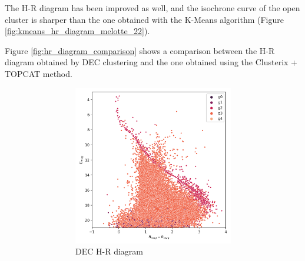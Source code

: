 \documentclass[11pt, a4paper, english]{book}
\begin{document}
The H-R diagram has been improved as well, and the isochrone curve of the open cluster is sharper than the one obtained with the K-Means algorithm
(Figure \ref{fig:kmeans_hr_diagram_melotte_22}).

Figure \ref{fig:hr_diagram_comparison} shows a comparison between the H-R diagram obtained by DEC clustering and the one obtained
using the Clusterix + TOPCAT method.

\begin{figure}[htbp]
  \centering
  \begin{subfigure}{0.9\textwidth}
    \centering
    \begin{subfigure}[t]{0.45\textwidth}
      \centering
      \includegraphics[width=\textwidth]{../figures/melotte_22/dec_hr_diagram_melotte_22.png}
      \caption{DEC H-R diagram}
    \end{subfigure}
    \hfill
    \begin{subfigure}[t]{0.45\textwidth}
      \centering

\end{subfigure}
\end{subfigure}
\end{figure}
\end{document}
